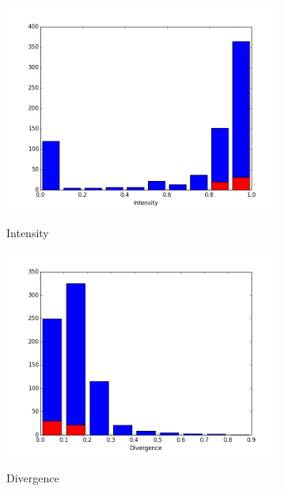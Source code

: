 \documentclass[notitlepage]{article}
\begin{document}
\begin{figure}[h!]
\centering
\ContinuedFloat 
\begin{subfigure}{.3\textwidth}
  \centering
  \includegraphics[width=\textwidth]{intensity}
  \label{fig:intensity}
  \caption{Intensity}
\end{subfigure}
\begin{subfigure}{.3\textwidth}
  \centering
  \includegraphics[width=\textwidth]{divergence}
  \label{fig:divergence}
  \caption{Divergence}
\end{subfigure}
\begin{subfigure}{.3\textwidth}
  \centering

\end{subfigure}
\end{figure}
\end{document}
